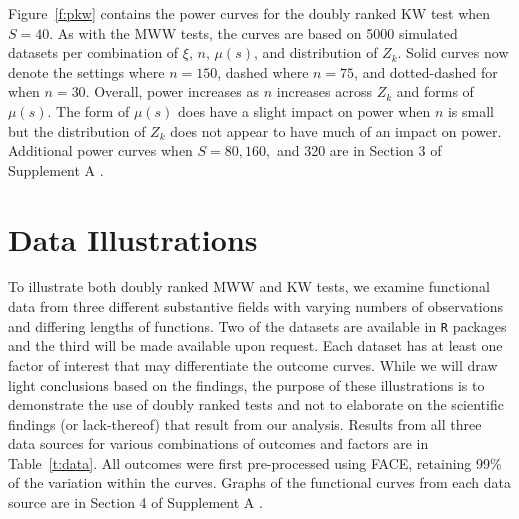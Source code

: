 \documentclass[12pt]{article}
\theoremstyle{plain}
\begin{document}

Figure~\ref{f:pkw} contains the power curves for the doubly ranked KW test when $S = 40$. As with the MWW tests, the curves are based on 5000 simulated datasets per combination of $\xi$, $n$, $\mu(s)$, and distribution of $Z_k$. Solid curves now denote the settings where $n = 150$, dashed where $n = 75$, and dotted-dashed for when $n = 30$. Overall, power increases as $n$ increases across $Z_k$ and forms of $\mu(s)$. The form of $\mu(s)$ does have a slight impact on power when $n$ is small but the distribution of $Z_k$ does not appear to have much of an impact on power. Additional power curves when $S = 80, 160,$ and 320 are in Section 3 of Supplement A \citep{DRTSup2024A}.


\section{Data Illustrations}
\label{s:app}

To illustrate both doubly ranked MWW and KW tests, we examine functional data from three different substantive fields with varying numbers of observations and differing lengths of functions. Two of the datasets are available in \texttt{R} packages and the third will be made available upon request. Each dataset has at least one factor of interest that may differentiate the outcome curves. While we will draw light conclusions based on the findings, the purpose of these illustrations is to demonstrate the use of doubly ranked tests and not to elaborate on the scientific findings (or lack-thereof) that result from our analysis. Results from all three data sources for various combinations of outcomes and factors are in Table~\ref{t:data}. All outcomes were first pre-processed using FACE, retaining 99\% of the variation within the curves. Graphs of the functional curves from each data source are in Section 4 of Supplement A \citep{DRTSup2024A}.
\end{document}
